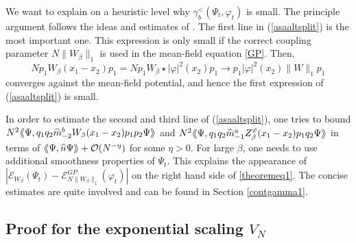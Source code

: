 \documentclass[11pt, english, american]{article}
\newcommand{\laa}{\langle\hspace{-0.08cm}\langle}
\newcommand{\raa}{\rangle\hspace{-0.08cm}\rangle}
\renewcommand{\phi}{\varphi}
\begin{document}
  
We want to explain on a heuristic level why $\gamma^<_{b}(\Psi_t,\phi_t)$ is small.
The principle argument follows the ideas and estimates of \cite{picklgp3d}.
The first line in (\ref{asaaltsplit}) is the most important one. This expression is only small if the correct coupling parameter $N \|W_\beta\|_1$  is used in  the mean-field equation \eqref{GP}. Then,
$$N p_1 W_\beta(x_1-x_2)p_1=N p_1W_\beta\star|\phi|^2(x_2)p_1
\rightarrow p_1 |\phi|^2(x_2) \|W\|_1 p_1 $$
 converges against the mean-field potential, and hence the first expression of (\ref{asaaltsplit}) is small. 

In order to estimate the second and third line of (\ref{asaaltsplit}), one  tries to bound \\$N^2\laa\Psi ,q_{1}q_{2}\widehat{m}^b_{-2}W_\beta(x_1-x_2) p_{1}p_{2}
\Psi\raa$ and $N^2\laa\Psi ,q_{1}q_{2}\widehat{m}^a_{-1}Z^{\varphi}_\beta(x_1-x_2) p_{1}q_{2}
\Psi\raa$ in terms of $\laa \Psi, \widehat{n} \Psi \raa + \mathcal{O}(N^{-\eta})$ for some $\eta>0$.  
For large $\beta$, one needs  to use additional smoothness properties of $\Psi_t$. This explains the appearance of $\left|
\mathcal{E}_{W_\beta}(\Psi_t)
-
\mathcal{E}_{N \|W_\beta\|_1}^ {GP}(\phi_t)
\right|$ on the right hand side of  \eqref{theoremeq1}. The concise estimates are quite involved and can be found in Section \ref{contgamma1}.





\subsection{Proof for the exponential scaling $V_N$}
\end{document}
